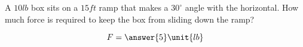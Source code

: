 \documentclass{ximera}
\author{Gregory Hartman \and Matthew Carr}
\begin{document}
\begin{exercise}




A $10\unit{lb}$ box sits on a $15\unit{ft}$ ramp that makes a $30^{\circ}$ angle with the horizontal. How much force is required to keep the box from sliding down the ramp?

\begin{prompt}
\[
F=\answer{5}\unit{lb}
\]
\end{prompt}

\end{exercise}
\end{document}
